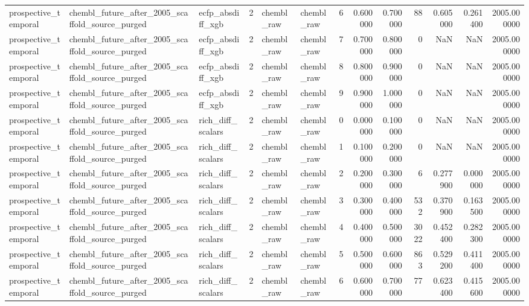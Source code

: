 \begin{longtable}{lllrllrrrrrrr}
prospective\_temporal & chembl\_future\_after\_2005\_scaffold\_source\_purged & ecfp\_absdiff\_xgb & 2 & chembl\_raw & chembl\_raw & 6 & 0.600000 & 0.700000 & 88 & 0.605000 & 0.261400 & 2005.000000 \\
prospective\_temporal & chembl\_future\_after\_2005\_scaffold\_source\_purged & ecfp\_absdiff\_xgb & 2 & chembl\_raw & chembl\_raw & 7 & 0.700000 & 0.800000 & 0 & NaN & NaN & 2005.000000 \\
prospective\_temporal & chembl\_future\_after\_2005\_scaffold\_source\_purged & ecfp\_absdiff\_xgb & 2 & chembl\_raw & chembl\_raw & 8 & 0.800000 & 0.900000 & 0 & NaN & NaN & 2005.000000 \\
prospective\_temporal & chembl\_future\_after\_2005\_scaffold\_source\_purged & ecfp\_absdiff\_xgb & 2 & chembl\_raw & chembl\_raw & 9 & 0.900000 & 1.000000 & 0 & NaN & NaN & 2005.000000 \\
prospective\_temporal & chembl\_future\_after\_2005\_scaffold\_source\_purged & rich\_diff\_scalars & 2 & chembl\_raw & chembl\_raw & 0 & 0.000000 & 0.100000 & 0 & NaN & NaN & 2005.000000 \\
prospective\_temporal & chembl\_future\_after\_2005\_scaffold\_source\_purged & rich\_diff\_scalars & 2 & chembl\_raw & chembl\_raw & 1 & 0.100000 & 0.200000 & 0 & NaN & NaN & 2005.000000 \\
prospective\_temporal & chembl\_future\_after\_2005\_scaffold\_source\_purged & rich\_diff\_scalars & 2 & chembl\_raw & chembl\_raw & 2 & 0.200000 & 0.300000 & 6 & 0.277900 & 0.000000 & 2005.000000 \\
prospective\_temporal & chembl\_future\_after\_2005\_scaffold\_source\_purged & rich\_diff\_scalars & 2 & chembl\_raw & chembl\_raw & 3 & 0.300000 & 0.400000 & 532 & 0.370900 & 0.163500 & 2005.000000 \\
prospective\_temporal & chembl\_future\_after\_2005\_scaffold\_source\_purged & rich\_diff\_scalars & 2 & chembl\_raw & chembl\_raw & 4 & 0.400000 & 0.500000 & 3022 & 0.452400 & 0.282300 & 2005.000000 \\
prospective\_temporal & chembl\_future\_after\_2005\_scaffold\_source\_purged & rich\_diff\_scalars & 2 & chembl\_raw & chembl\_raw & 5 & 0.500000 & 0.600000 & 863 & 0.529200 & 0.411400 & 2005.000000 \\
prospective\_temporal & chembl\_future\_after\_2005\_scaffold\_source\_purged & rich\_diff\_scalars & 2 & chembl\_raw & chembl\_raw & 6 & 0.600000 & 0.700000 & 77 & 0.623400 & 0.415600 & 2005.000000 \\

\end{longtable}
